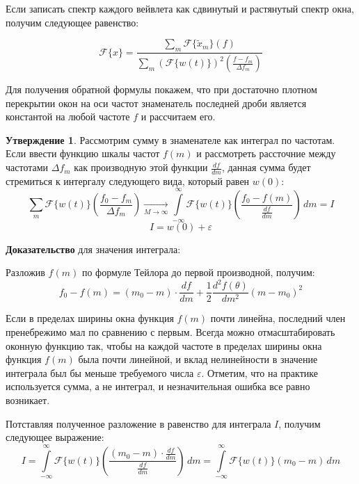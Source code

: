 Если записать спектр каждого вейвлета как сдвинутый и растянутый спектр окна, получим следующее равенство:

\begin{equation}
  \mathcal{F}\{x\} = 
  \frac{
    \sum \limits_m \mathcal{F}\{\tilde{x}_m\}(f)
  }{
    \sum \limits_m (\mathcal{F}\{w(t)\})^2 \left(\frac{f - f_m}{\Delta f_m}\right)
  }
  \label{eq:wavelets_back_spec}
\end{equation}


Для получения обратной формулы покажем, что при достаточно плотном перекрытии окон на оси частот
знаменатель последней дроби является константой на любой частоте $f$ и рассчитаем его.

\textbf{Утверждение 1}. Рассмотрим сумму в знаменателе как интеграл по частотам.
Если ввести функцию шкалы частот $f(m)$ и рассмотреть рассточние между частотами $\Delta f_m$ как производную этой функции $\frac{df}{dm}$,
данная сумма будет стремиться к интергалу следующего вида, который равен $w(0)$:
\begin{equation}
\sum \limits_m \mathcal{F}\{w(t)\} \left(\frac{f_0 - f_m}{\Delta f_m}\right) 
  \xrightarrow[M \to \infty]{} 
\int \limits_{-\infty}^\infty \mathcal{F}\{w(t)\} \left(\frac{f_0 - f(m)}{\frac{df}{dm}}\right) \, dm
  = I
\end{equation}
\[
I = w(0) + \varepsilon
\]

\textbf{Доказательство} для значения интеграла:

Разложив $f(m)$ по формуле Тейлора до первой производной, получим:
\begin{equation}
  f_0 - f(m) = (m_0 - m) \cdot \frac{df}{dm} + \frac{1}{2} \frac{d^2f(\theta)}{dm^2} (m - m_0)^2
\end{equation}

Если в пределах ширины окна функция $f(m)$ почти линейна, последний член пренебрежимо мал по сравнению с первым. 
Всегда можно отмасштабировать оконную функцию так, чтобы на каждой частоте в пределах ширины окна функция $f(m)$ была почти линейной, 
и вклад нелинейности в значение интеграла был бы меньше требуемого числа $\varepsilon$. Отметим, что на практике используется сумма, 
а не интеграл, и незначительная ошибка все равно возникает.

Потставляя полученное разложение в равенство для интеграла $I$, получим следующее выражение:
\begin{equation}
  I = 
  \int \limits_{-\infty}^\infty \mathcal{F}\{w(t)\} \left(\frac{(m_0 - m) \cdot \frac{df}{dm}}{\frac{df}{dm}}\right) \, dm = 
  \int \limits_{-\infty}^\infty \mathcal{F}\{w(t)\} \left(m_0 - m\right) \, dm
\end{equation}

